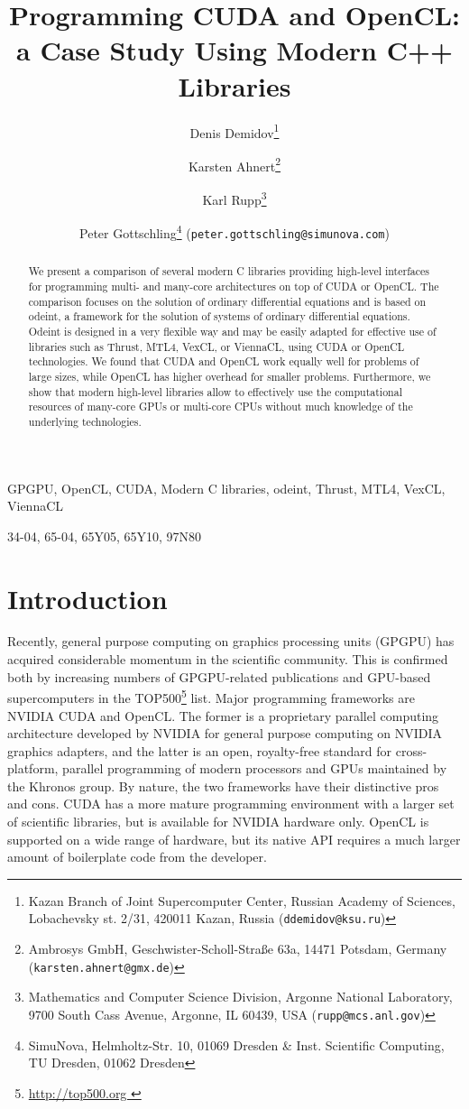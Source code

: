\documentclass[final]{siamltex}
\title{Programming CUDA and OpenCL:\\a Case Study Using Modern C++ Libraries}
\author{
Denis Demidov\thanks{
Kazan Branch of Joint Supercomputer Center,
Russian Academy of Sciences,
Lobachevsky st. 2/31, 420011 Kazan, Russia
({\tt ddemidov@ksu.ru}) }
\and Karsten Ahnert\thanks{Ambrosys GmbH, Geschwister-Scholl-Stra\ss e 63a, 14471 Potsdam, Germany ({\tt karsten.ahnert@gmx.de}) }
\and Karl Rupp\thanks{Mathematics and Computer Science Division,
Argonne National Laboratory,
9700 South Cass Avenue, Argonne, IL 60439, USA
({\tt rupp@mcs.anl.gov}) }
\and Peter Gottschling\thanks{SimuNova, Helmholtz-Str. 10, 01069 Dresden \&
Inst. Scientific Computing, TU Dresden, 01062 Dresden}
({\tt peter.gottschling@simunova.com}) }
\newcommand{\addpp}[1]{{#1\nolinebreak[4]\hspace{-.05em}\raisebox{.4ex}{\tiny\bf ++}}\xspace}
\newcommand{\Cpp}{\addpp{C}}
\begin{document}
\maketitle

\begin{abstract}
    We present a comparison of several modern \Cpp libraries providing high-level interfaces
    for programming multi- and many-core architectures on top of CUDA or OpenCL.
    The comparison focuses on the solution of ordinary differential equations and is based on odeint,
    a framework for the solution of systems of ordinary differential equations. Odeint is designed in a
    very flexible way and may be easily adapted for effective use of libraries such
    as Thrust, MTL4, VexCL, or ViennaCL, using CUDA or OpenCL technologies.
    We found that CUDA and OpenCL work equally well for problems
    of large sizes, while OpenCL has higher overhead for smaller problems.
    Furthermore, we show that modern high-level libraries allow to effectively
    use the computational resources of many-core GPUs or multi-core CPUs without much
    knowledge of the underlying technologies.
\end{abstract}

\begin{keywords}
    GPGPU, OpenCL, CUDA, Modern \Cpp libraries, odeint, Thrust, MTL4, VexCL, ViennaCL
\end{keywords}

\begin{AMS}
    34-04, 65-04, 65Y05, 65Y10, 97N80
\end{AMS}


%
%
\section{Introduction}

\pagestyle{myheadings}

\thispagestyle{plain}


Recently, general purpose computing on graphics processing units (GPGPU) has
acquired considerable momentum in the scientific community. This is confirmed
both by increasing numbers of GPGPU-related publications and GPU-based
supercomputers in the TOP500\footnote{ \href{ http://top500.org }{
http://top500.org }} list. Major programming frameworks are NVIDIA CUDA and
OpenCL.
The former is a proprietary parallel computing architecture developed
by NVIDIA for general purpose computing on NVIDIA graphics adapters, and the
 latter is an open, royalty-free standard for cross-platform, parallel
programming of modern processors and GPUs maintained by the Khronos group. By
nature, the two frameworks have their distinctive pros and cons. CUDA has a
more mature programming environment with a larger set of scientific libraries,
but is available for NVIDIA hardware only. OpenCL is supported on a wide range
of hardware, but its native API requires a much larger amount of boilerplate
code from the developer.
\end{document}
